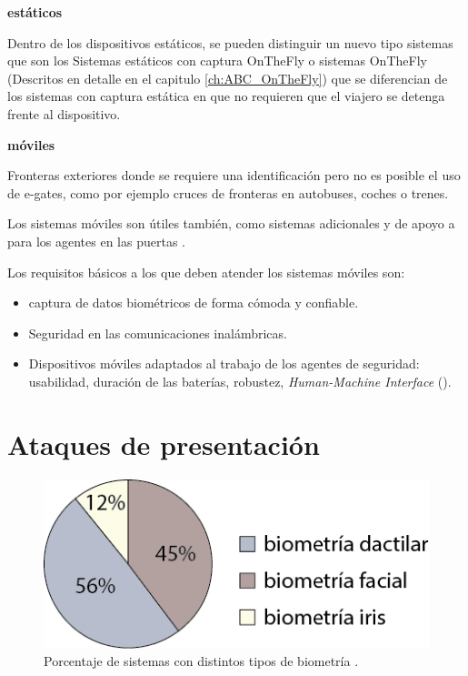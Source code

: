 \begin{itemize}
\medskip
\textbf{ estáticos}

Dentro de los dispositivos estáticos, se pueden distinguir un nuevo tipo sistemas que son los Sistemas  estáticos con captura \gls{OnTheFly} o sistemas  \gls{OnTheFly} (Descritos en detalle en el capitulo \ref{ch:ABC_OnTheFly}) que se diferencian de los sistemas  con captura estática en que no requieren que el viajero se detenga frente al dispositivo.  

\medskip
\textbf{ móviles}

Fronteras exteriores donde se requiere una identificación pero no es posible el uso de \glspl{e-gate}, como por ejemplo cruces de fronteras en autobuses, coches o trenes.

Los sistemas móviles son útiles también, como sistemas adicionales y de apoyo a para los agentes en las puertas .

Los requisitos básicos a los que deben atender los sistemas  móviles son:

\begin{itemize}
\item
\Gls{captura} de datos biométricos de forma cómoda y confiable.

\item
Seguridad en las comunicaciones inalámbricas.

\item
Dispositivos móviles adaptados al trabajo de los agentes de seguridad: \Gls{usabilidad}, duración de las baterías, robustez, \textit{Human-Machine Interface} (\textbf{}).

\end{itemize}

\end{itemize}



\section{Ataques de presentación}\label{sec:ContextoAtaquesPresentacion}

\begin{figure}[t]
    \centering
    \includegraphics[width=0.6\linewidth]{ch-sistemasABC/images/ch-SistemasABC/PORCENTAJES_TIPOS_BIOMETRIAS.png}
    \caption{Porcentaje de sistemas  con distintos tipos de biometría \cite{donida2016emerging}.}
    \label{fig:ABCDisintasBiometrias}
\end{figure}


